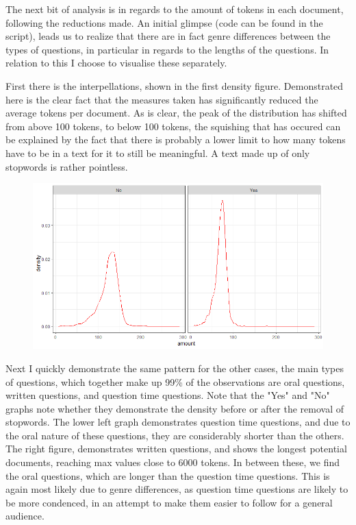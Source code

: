 \documentclass[12pt]{article}
\begin{document}
	The next bit of analysis is in regards to the amount of tokens in each document, following the reductions made. An initial glimpse (code can be found in the script), leads us to realize that there are in fact genre differences between the types of questions, in particular in regards to the lengths of the questions. In relation to this I choose to visualise these separately. 
	
	First there is the interpellations, shown in the first density figure. Demonstrated here is the clear fact that the measures taken has significantly reduced the average tokens per document. As is clear, the peak of the distribution has shifted from above 100 tokens, to below 100 tokens, the squishing that has occured can be explained by the fact that there is probably a lower limit to how many tokens have to be in a text for it to still be meaningful. A text made up of only stopwords is rather pointless.
	
	\begin{figure}[h]
		\includegraphics[scale=0.60]{Img/preposttreatedinterpell.png}
	\end{figure}
	
	Next I quickly demonstrate the same pattern for the other cases, the main types of questions, which together make up 99\% of the observations are oral questions, written questions, and question time questions. Note that the "Yes" and "No" graphs note whether they demonstrate the density before or after the removal of stopwords. The lower left graph demonstrates question time questions, and due to the oral nature of these questions, they are considerably shorter than the others. The right figure, demonstrates written questions, and shows the longest potential documents, reaching max values close to 6000 tokens. In between these, we find the oral questions, which are longer than the question time questions. This is again most likely due to genre differences, as question time questions are likely to be more condenced, in an attempt to make them easier to follow for a general audience.
	
\end{document}
